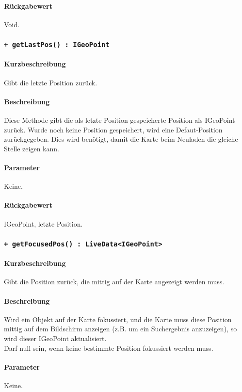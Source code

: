 \paragraph*{Rückgabewert}
Void.

\subsubsection*{\texttt{+ getLastPos() : IGeoPoint}}%
\paragraph*{Kurzbeschreibung}
Gibt die letzte Position zurück.
\paragraph*{Beschreibung}
Diese Methode gibt die als letzte Position gespeicherte Position als IGeoPoint zurück.
Wurde noch keine Position gespeichert, wird eine Defaut-Position zurückgegeben.
Dies wird benötigt, damit die Karte beim Neuladen die gleiche Stelle zeigen kann.
\paragraph*{Parameter}
Keine.
\paragraph*{Rückgabewert}
IGeoPoint, letzte Position.

\subsubsection*{\texttt{+ getFocusedPos() : LiveData<IGeoPoint>}}%
\paragraph*{Kurzbeschreibung}
Gibt die Position zurück, die mittig auf der Karte angezeigt werden muss.
\paragraph*{Beschreibung}
Wird ein Objekt auf der Karte fokussiert, und die Karte muss diese Position mittig auf dem 
Bildschirm anzeigen (z.B. um ein Suchergebnis anzuzeigen), so wird dieser IGeoPoint aktualisiert.\\
Darf null sein, wenn keine bestimmte Position fokussiert werden muss.
\paragraph*{Parameter}
Keine.

